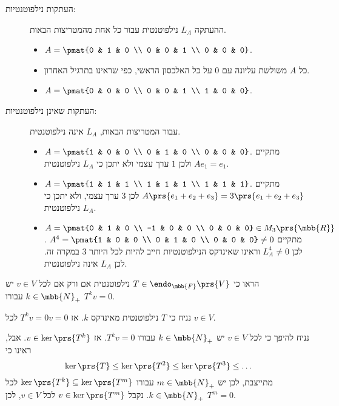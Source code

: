 \documentclass[a4paper,10pt,oneside,openany]{article}
\begin{document}
\begin{examples}
\begin{description}
\item[העתקות נילפוטנטיות:]
ההעתקה
$L_A$
נילפוטנטית עבור כל אחת מהמטריצות הבאות.
\begin{itemize}
\item $A = \pmat{0 & 1 & 0 \\ 0 & 0 & 1 \\ 0 & 0 & 0}$.
\item כל $A$
משולשת עליונה עם
$0$
על כל האלכסון הראשי, כפי שראינו בתרגיל האחרון.
\item $A = \pmat{0 & 0 & 0 \\ 0 & 0 & 1 \\ 1 & 0 & 0}$.
\end{itemize}
\item[העתקות שאינן נילפוטנטיות:]
עבור המטריצות הבאות,
$L_A$
אינה נילפוטנטית.
\begin{itemize}
\item $A = \pmat{1 & 0 & 0 \\ 0 & 1 & 0 \\ 0 & 0 & 0}$.
מתקיים
$Ae_1 = e_1$
ולכן
$1$
ערך עצמי ולא יתכן כי
$L_A$
נילפוטנטית.
\item $A = \pmat{1 & 1 & 1 \\ 1 & 1 & 1 \\ 1 & 1 & 1}$.
מתקיים
$A\prs{e_1 + e_2 + e_3} = 3 \prs{e_1 + e_2 + e_3}$
לכן
$3$
ערך עצמי, ולא יתכן כי
$L_A$
נילפוטנטית.
\item $A = \pmat{0 & 1 & 0 \\ -1 & 0 & 0 \\ 0 & 0 & 0} \in M_3\prs{\mbb{R}}$.
מתקיים
$A^4 = \pmat{1 & 0 & 0 \\ 0 & 1 & 0 \\ 0 & 0 & 0} \neq 0$
לכן
$L_A^4 \neq 0$
וראינו שאינדקס הנילפוטנטיות חייב להיות לכל היותר
$3$
במקרה זה. לכן
$L_A$
אינה נילפוטנטית.
\end{itemize}
\end{description}
\end{examples}

\begin{exercise}
הראו כי
$T \in \endo_{\mbb{F}}\prs{V}$
נילפוטנטית אם ורק אם לכל
$v \in V$
יש
$k \in \mbb{N}_+$
עבורו
$T^k v = 0$.
\end{exercise}

\begin{solution}
נניח כי
$T$
נילפוטנטית מאינדקס
$k$.
אז
$T^k v = 0 v = 0$
לכל
$v \in V$.

נניח להיפך כי לכל
$v \in V$
יש
$k \in \mbb{N}_+$
עבורו
$T^k v = 0$.
אז
$v \in \ker\prs{T^k}$.
אבל, ראינו כי
\[\ker\prs{T} \leq \ker\prs{T^2} \leq \ker\prs{T^3} \leq \ldots\]
מתייצבת, לכן יש
$m \in \mbb{N}_+$
עבורו
$\ker\prs{T^k} \subseteq \ker\prs{T^m}$
לכל
$k \in \mbb{N}_+$.
נקבל
$v \in \ker\prs{T^m}$
לכל
$v \in V$,
לכן
$T^m = 0$.
\end{solution}
\end{document}
